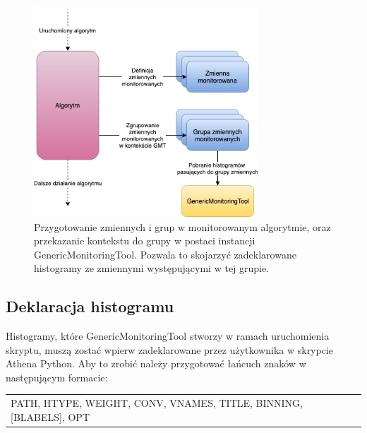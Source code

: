 \begin{figure}[!ht]
\centering
\includegraphics[width=0.75\textwidth]{img/algo_run.png}
\caption{
Przygotowanie zmiennych i grup w monitorowanym algorytmie, oraz przekazanie kontekstu do grupy w postaci instancji GenericMonitoringTool. Pozwala to skojarzyć zadeklarowane histogramy ze zmiennymi występującymi w tej grupie. 
}
\label{fig:athena:algoRun}
\end{figure}

\subsection{Deklaracja histogramu}
Histogramy, które GenericMonitoringTool stworzy w ramach uruchomienia skryptu, muszą zostać wpierw zadeklarowane przez użytkownika w skrypcie Athena Python. Aby to zrobić należy przygotować łańcuch znaków w następującym formacie: 

\begin{center}
\begin{tabular}{l}
PATH, HTYPE, WEIGHT, CONV, VNAMES, TITLE, BINNING, [BLABELS], OPT
\end{tabular}
\end{center}

